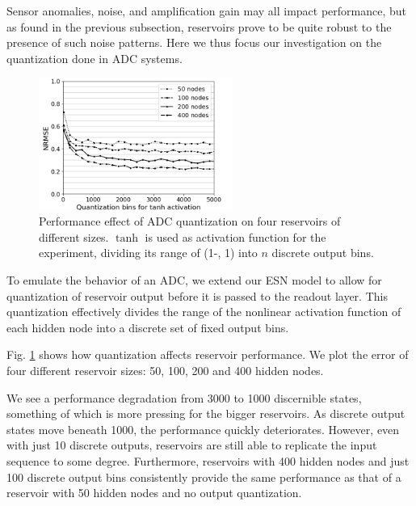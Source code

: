 Sensor anomalies, noise, and amplification gain may all impact performance, but
as found in the previous subsection, reservoirs prove to be quite robust to the
presence of such noise patterns. Here we thus focus our investigation on the
quantization done in ADC systems.


\begin{figure}[H]
  \centering
  \includegraphics[width=2.5in]{img/adc_quantization.png}
  \caption{
    Performance effect of ADC quantization on four reservoirs of different
sizes. $\tanh$ is used as activation function for the experiment, dividing its
range of (1-, 1) into $n$ discrete output bins.
  }
  \label{adc_quantization}
\end{figure}


To emulate the behavior of an ADC, we extend our ESN model to allow for
quantization of reservoir output before it is passed to the readout layer. This
quantization effectively divides the range of the nonlinear activation function
of each hidden node into a discrete set of fixed output bins.

Fig. \ref{adc_quantization} shows how quantization affects reservoir
performance. We plot the error of four different reservoir sizes: 50, 100, 200
and 400 hidden nodes.

We see a performance degradation from 3000 to 1000 discernible states, something
of which is more pressing for the bigger reservoirs. As discrete output states
move beneath 1000, the performance quickly deteriorates. However, even with just
10 discrete outputs, reservoirs are still able to replicate the input sequence
to some degree. Furthermore, reservoirs with 400 hidden nodes and just 100
discrete output bins consistently provide the same performance as that of a
reservoir with 50 hidden nodes and no output quantization.

